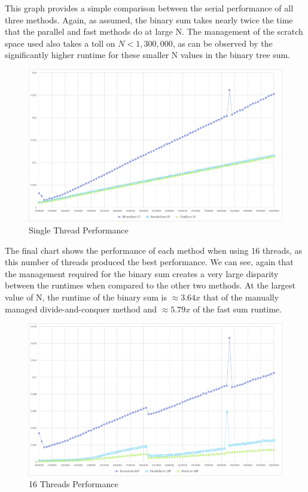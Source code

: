 \documentclass[a4paper, 11pt]{article}
\begin{document}
This graph provides a simple comparison between the serial performance of all three methods. Again, as assumed, the binary sum takes nearly twice the time that the parallel and fast methods do at large N. The management of the scratch space used also takes a toll on $N < 1,300,000$, as can be observed by the significantly higher runtime for these smaller N values in the binary tree sum.
\begin{figure}[H]
	\centering
	\includegraphics[width=\textwidth]{1_thread.png}
	\caption{Single Thread Performance}
\end{figure}

The final chart shows the performance of each method when using 16 threads, as this number of threads produced the best performance. We can see, again that the management required for the binary sum creates a very large disparity between the runtimes when compared to the other two methods. At the largest value of N, the runtime of the binary sum is $\approx 3.64x$ that of the manually managed divide-and-conquer method and $\approx 5.79x$ of the fast sum runtime.
\begin{figure}[H]
	\centering
	\includegraphics[width=\textwidth]{16_threads.png}
	\caption{16 Threads Performance}
\end{figure}
\end{document}
